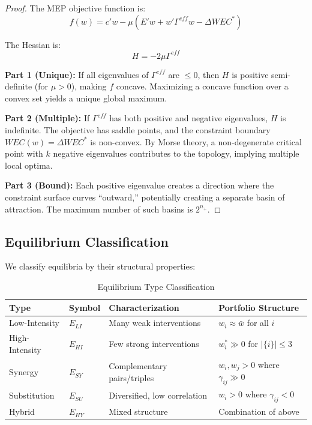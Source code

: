 \begin{proof}
The MEP objective function is:
\begin{equation}
f(w) = c'w - \mu(E'w + w'\Gamma^{eff}w - \Delta WEC^*)
\end{equation}

The Hessian is:
\begin{equation}
H = -2\mu \Gamma^{eff}
\end{equation}

\textbf{Part 1 (Unique):} If all eigenvalues of $\Gamma^{eff}$ are $\leq 0$, then
$H$ is positive semi-definite (for $\mu > 0$), making $f$ concave. Maximizing a
concave function over a convex set yields a unique global maximum.

\textbf{Part 2 (Multiple):} If $\Gamma^{eff}$ has both positive and negative
eigenvalues, $H$ is indefinite. The objective has saddle points, and the constraint
boundary $WEC(w) = \Delta WEC^*$ is non-convex. By Morse theory, a non-degenerate
critical point with $k$ negative eigenvalues contributes to the topology, implying
multiple local optima.

\textbf{Part 3 (Bound):} Each positive eigenvalue creates a direction where the
constraint surface curves ``outward,'' potentially creating a separate basin of
attraction. The maximum number of such basins is $2^{n_+}$.
\end{proof}

\subsection{Equilibrium Classification}

\begin{definition}
We classify equilibria by their structural properties:

\begin{table}[H]
\centering
\caption{Equilibrium Type Classification}
\label{tab:meq-types}
\renewcommand{\arraystretch}{1.4}
\begin{tabular}{@{}llll@{}}
\toprule
\textbf{Type} & \textbf{Symbol} & \textbf{Characterization} & \textbf{Portfolio Structure} \\
\midrule
Low-Intensity & $E_{LI}$ & Many weak interventions & $w_i \approx \bar{w}$ for all $i$ \\
High-Intensity & $E_{HI}$ & Few strong interventions & $w_i^* \gg 0$ for $|\{i\}| \leq 3$ \\
Synergy & $E_{SY}$ & Complementary pairs/triples & $w_i, w_j > 0$ where $\gamma_{ij} \gg 0$ \\
Substitution & $E_{SU}$ & Diversified, low correlation & $w_i > 0$ where $\gamma_{ij} < 0$ \\
Hybrid & $E_{HY}$ & Mixed structure & Combination of above \\
\bottomrule
\end{tabular}
\end{table}
\end{definition}

